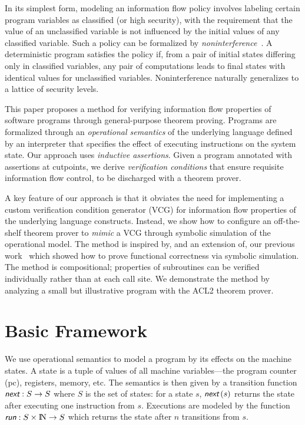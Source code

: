\documentclass[conference]{IEEEtran}
\newcommand{\func}[1]{\ensuremath{\mbox{{\sf {\em #1}}}}}
\newcommand{\naturals}{{\mathrm{I}\!\mathrm{N}}}
\begin{document}
In its simplest form, modeling an information flow policy involves
labeling certain program variables as classified (or high security),
with the requirement that the value of an unclassified variable is not
influenced by the initial values of any classified variable.  Such a
policy can be formalized by {\em noninterference}~\cite{goguen82}.  A
deterministic program satisfies the policy if, from a pair of initial
states differing only in classified variables, any pair of
computations leads to final states with identical values for
unclassified variables.  Noninterference naturally generalizes to a
lattice of security levels.

This paper proposes a method for verifying information flow properties
of software programs through general-purpose theorem proving.
Programs are formalized through an {\em operational semantics} of the
underlying language defined by an interpreter that specifies the
effect of executing instructions on the system state.  Our approach
uses {\em inductive assertions}.  Given a program annotated with
assertions at cutpoints, we derive {\em verification conditions} that
ensure requisite information flow control, to be discharged with a
theorem prover.

A key feature of our approach is that it obviates the need for
implementing a custom verification condition generator (VCG) for
information flow properties of the underlying language constructs.
Instead, we show how to configure an off-the-shelf theorem prover to
{\em mimic} a VCG through symbolic simulation of the operational
model.  The method is inspired by, and an extension of, our previous
work~\cite{symbolic} which showed how to prove functional correctness
via symbolic simulation.  The method is compositional; properties of
subroutines can be verified individually rather than at each call
site.  We demonstrate the method by analyzing a small but illustrative
program with the ACL2 theorem prover.

\section{Basic Framework}
\label{sec:basic-framework}

We use operational semantics to model a
program by its effects on the machine states.  A
state is a tuple of values of all machine variables---the program
counter (pc), registers, memory, etc.  The semantics is then given by
a transition function $\func{next}:S\rightarrow S$ where $S$ is the
set of states: for a state $s$, $\func{next}\,(s)$ returns the state
after executing one instruction from $s$.  Executions are modeled by
the function $\func{run}:S\times\naturals\rightarrow S$ which returns
the state after $n$ transitions from $s$.
\end{document}
